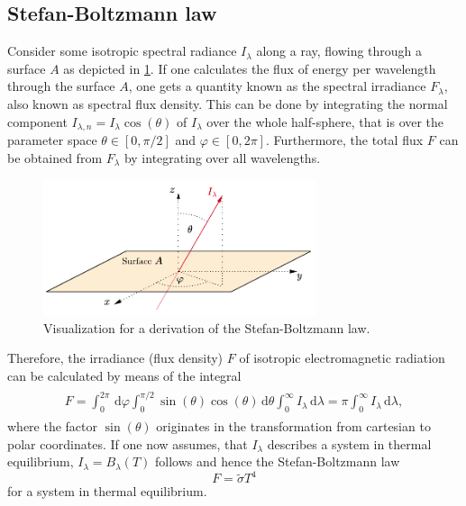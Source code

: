 \documentclass[a4paper,12pt]{report}
\begin{document}
\subsection{Stefan-Boltzmann law}
Consider some isotropic spectral radiance $I_\lambda$ along a ray, flowing through a surface $A$ as depicted in \cref{fig:isotropicrad}. If one calculates the flux of energy per wavelength through the surface $A$, one gets a quantity known as the spectral irradiance $F_\lambda$, also known as spectral flux density. This can be done by integrating the normal component $I_{\lambda,n} = I_\lambda \cos(\theta)$ of $I_\lambda$ over the whole half-sphere, that is over the parameter space $\theta \in [0,\pi/2]$ and $\varphi \in [0,2\pi]$. Furthermore, the total flux $F$ can be obtained from $F_\lambda$ by integrating over all wavelengths.
\begin{figure}[h]
\centering
\includegraphics[width=8cm]{figures/isotropicrad.pdf}
\caption{Visualization for a derivation of the Stefan-Boltzmann law.}
\label{fig:isotropicrad}
\end{figure}
Therefore, the irradiance (flux density) $F$ of isotropic electromagnetic radiation can be calculated by means of the integral \begin{align}
\begin{aligned}
F = \int_{0}^{2\pi}\,\mathrm{d}\varphi \int_{0}^{\pi/2}\sin(\theta)\cos(\theta)\,\mathrm{d}\theta \int_{0}^{\infty}I_\lambda\,\mathrm{d}\lambda = \pi\int_{0}^{\infty}I_\lambda\,\mathrm{d}\lambda,
\end{aligned}
\end{align} where the factor $\sin(\theta)$ originates in the transformation from cartesian to polar coordinates. If one now assumes, that $I_\lambda$ describes a system in thermal equilibrium, $I_\lambda = B_\lambda(T)$ follows and hence the Stefan-Boltzmann law \begin{equation}
F = \tilde{\sigma}T^4
\end{equation} for a system in thermal equilibrium.
\end{document}
